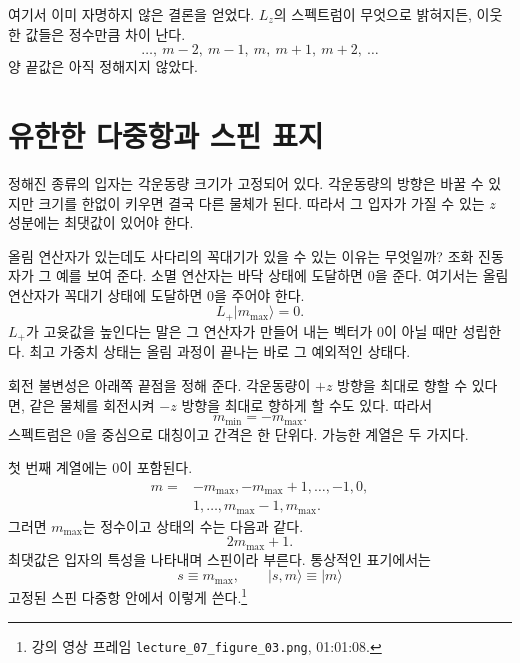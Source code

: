 여기서 이미 자명하지 않은 결론을 얻었다. \(L_z\)의 스펙트럼이 무엇으로 밝혀지든, 이웃한 값들은 정수만큼 차이 난다.\begin{equation}
\ldots,\ m-2,\ m-1,\ m,\ m+1,\ m+2,\ \ldots
\end{equation}양 끝값은 아직 정해지지 않았다.

\section{유한한 다중항과 스핀 표지}

정해진 종류의 입자는 각운동량 크기가 고정되어 있다. 각운동량의 방향은 바꿀 수 있지만 크기를 한없이 키우면 결국 다른 물체가 된다. 따라서 그 입자가 가질 수 있는 \(z\) 성분에는 최댓값이 있어야 한다.

올림 연산자가 있는데도 사다리의 꼭대기가 있을 수 있는 이유는 무엇일까? 조화 진동자가 그 예를 보여 준다. 소멸 연산자는 바닥 상태에 도달하면 0을 준다. 여기서는 올림 연산자가 꼭대기 상태에 도달하면 0을 주어야 한다.
\begin{equation}
L_+\lvert m_{\max}\rangle=0.
\end{equation}
\(L_+\)가 고윳값을 높인다는 말은 그 연산자가 만들어 내는 벡터가 0이 아닐 때만 성립한다. 최고 가중치 상태는 올림 과정이 끝나는 바로 그 예외적인 상태다.

회전 불변성은 아래쪽 끝점을 정해 준다. 각운동량이 \(+z\) 방향을 최대로 향할 수 있다면, 같은 물체를 회전시켜 \(-z\) 방향을 최대로 향하게 할 수도 있다. 따라서
\begin{equation}
m_{\min}=-m_{\max}.
\end{equation}
스펙트럼은 0을 중심으로 대칭이고 간격은 한 단위다. 가능한 계열은 두 가지다.

첫 번째 계열에는 0이 포함된다.\begin{equation}
\begin{aligned}
m={}&-m_{\max},-m_{\max}+1,\ldots,-1,0,\\
&1,\ldots,m_{\max}-1,m_{\max}.
\end{aligned}
\end{equation}그러면 \(m_{\max}\)는 정수이고 상태의 수는 다음과 같다.\begin{equation}
2m_{\max}+1.
\end{equation}최댓값은 입자의 특성을 나타내며 스핀이라 부른다. 통상적인 표기에서는\begin{equation}
s\equiv m_{\max},
\qquad
\lvert s,m\rangle\equiv\lvert m\rangle
\end{equation}고정된 스핀 다중항 안에서 이렇게 쓴다.\footnote{\raggedright 강의 영상 프레임 \nolinkurl{lecture_07_figure_03.png}, 01:01:08.\par}

